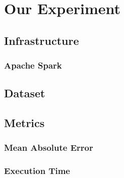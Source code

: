 \section{Our Experiment}
\subsection{Infrastructure}
\subsubsection{Apache Spark}
\cite{ApacheSpark:1}
\subsection{Dataset}
\cite{MovieLens:3}
\subsection{Metrics}
\subsubsection{Mean Absolute Error}
\subsubsection{Execution Time}